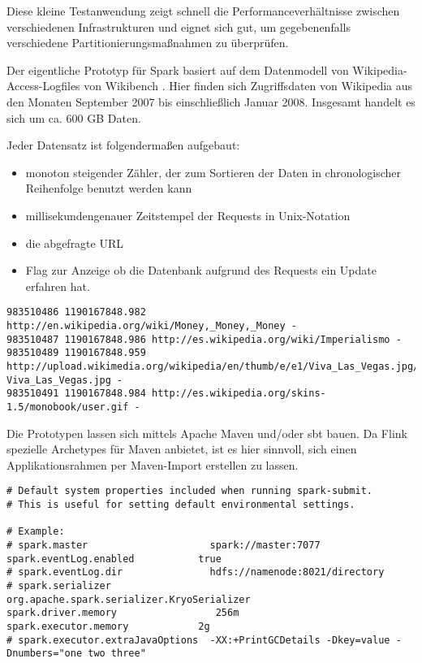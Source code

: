Diese kleine Testanwendung zeigt schnell die Performanceverhältnisse zwischen verschiedenen Infrastrukturen und eignet sich gut, um gegebenenfalls verschiedene Partitionierungsmaßnahmen zu überprüfen.  

Der eigentliche Prototyp für Spark basiert auf dem Datenmodell von Wikipedia-Access-Logfiles von Wikibench . Hier finden sich Zugriffsdaten von Wikipedia aus den Monaten September 2007 bis einschließlich Januar 2008. Insgesamt handelt es sich um ca. 600 GB Daten. 

Jeder Datensatz ist folgendermaßen aufgebaut:

\begin{itemize}
\item monoton steigender Zähler, der zum Sortieren der Daten in chronologischer Reihenfolge benutzt werden kann
\item millisekundengenauer Zeitstempel der Requests in Unix-Notation
\item die abgefragte URL
\item Flag zur Anzeige ob die Datenbank aufgrund des Requests ein Update erfahren hat. 
\end{itemize}

\begin{lstlisting}[label=vwikilogs,caption=Beispieleinträge der Wikipedia Access Logs.]
983510486 1190167848.982 http://en.wikipedia.org/wiki/Money,_Money,_Money -
983510487 1190167848.986 http://es.wikipedia.org/wiki/Imperialismo -
983510489 1190167848.959 http://upload.wikimedia.org/wikipedia/en/thumb/e/e1/Viva_Las_Vegas.jpg/180px-Viva_Las_Vegas.jpg -
983510491 1190167848.984 http://es.wikipedia.org/skins-1.5/monobook/user.gif -
\end{lstlisting}

Die Prototypen lassen sich mittels Apache Maven  und/oder sbt  bauen. Da Flink spezielle Archetypes für Maven anbietet, ist es hier sinnvoll, sich einen Applikationsrahmen per Maven-Import erstellen zu lassen.  

\begin{lstlisting}[label=configspark,caption=Konfigurationseinstellungen der lokalen Spark-Installation]
# Default system properties included when running spark-submit.
# This is useful for setting default environmental settings.

# Example:
# spark.master                     spark://master:7077
spark.eventLog.enabled           true
# spark.eventLog.dir               hdfs://namenode:8021/directory
# spark.serializer                 org.apache.spark.serializer.KryoSerializer
spark.driver.memory                 256m
spark.executor.memory			 2g
# spark.executor.extraJavaOptions  -XX:+PrintGCDetails -Dkey=value -Dnumbers="one two three"

\end{lstlisting}


